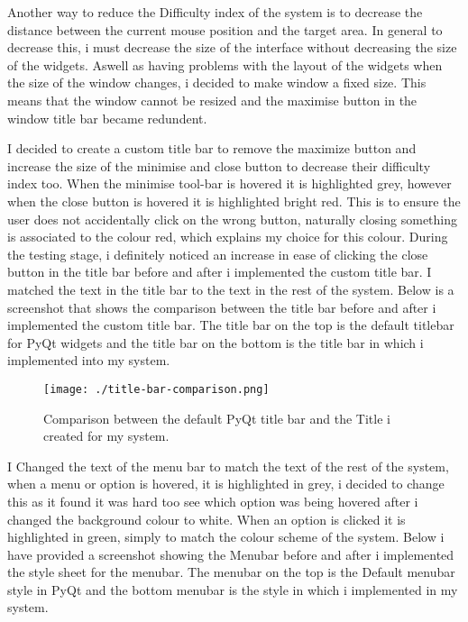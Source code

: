 Another way to reduce the Difficulty index of the system is to decrease the distance between the current mouse position and the target area. In general to decrease this, i must decrease the size of the interface without decreasing the size of the widgets. Aswell as having problems with the layout of the widgets when the size of the window changes, i decided to make window a fixed size. This means that the window cannot be resized and the maximise button in the window title bar became redundent.

 I decided to create a custom title bar to remove the maximize button and increase the size of the minimise and close button to decrease their difficulty index too. When the minimise tool-bar is hovered it is highlighted grey, however when the close button is hovered it is highlighted bright red. This is to ensure the user does not accidentally click on the wrong button, naturally closing something is associated to the colour red, which explains my choice for this colour. During the testing stage, i definitely noticed an increase in ease of clicking the close button in the title bar before and after i implemented the custom title bar. I matched the text in the title bar to the text in the rest of the system. Below is a screenshot that shows the comparison between the title bar before and after i implemented the custom title bar. The title bar on the top is the default titlebar for PyQt widgets and the title bar on the bottom is the title bar in which i implemented into my system. 

\begin{figure}[H]
    \texttt{[image: ./title-bar-comparison.png]}
    \caption{Comparison between the default PyQt title bar and the Title i created for my system.} \label{fig:title-bar-comparison}
\end{figure}

I Changed the text of the menu bar to match the text of the rest of the system, when a menu or option is hovered, it is highlighted in grey, i decided to change this as it found it was hard too see which option was being hovered after i changed the background colour to white. When an option is clicked it is highlighted in green, simply to match the colour scheme of the system. Below i have provided a screenshot showing the Menubar before and after i implemented the style sheet for the menubar. The menubar on the top is the Default menubar style in PyQt and the bottom menubar is the style in which i implemented in my system.

